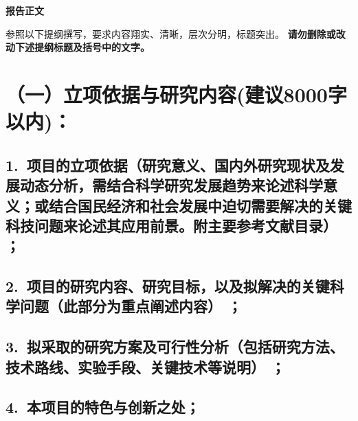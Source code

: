 \documentclass[12pt,UTF8,AutoFakeBold=2.5,a4paper]{ctexart} %
\begin{document}
\begin{center}
{\sanhao \templatefont \bfseries \hspace{2em} 报告正文}
\end{center}

{\sihao \templatefont 参照以下提纲撰写，要求内容翔实、清晰，层次分明，标题突出。{\color{MsBlue} \bfseries 请勿删除或改动下述提纲标题及括号中的文字。}}
\vskip -5mm

\section{{\bfseries（一）立项依据与研究内容}(建议8000字以内)：} %

\subsection{\hspace{1.45em} 1.~{\bfseries 项目的立项依据}（研究意义、国内外研究现状及发展动态分析，需结合科学研究发展趋势来论述科学意义；或结合国民经济和社会发展中迫切需要解决的关键科技问题来论述其应用前景。附主要参考文献目录）\hspace{-14pt} ；}






\subsection{\hspace{1.45em} 2.~{\bfseries 项目的研究内容、研究目标，以及拟解决的关键科学问题}（此部分为重点阐述内容）\hspace{-14pt} {\bfseries ；}}



\subsection{\hspace{1.45em}  3.~{\bfseries 拟采取的研究方案及可行性分析}（包括研究方法、技术路线、实验手段、关键技术等说明）\hspace{-14pt} ；}



\subsection{\hspace{1.45em}  4.~{\bfseries 本项目的特色与创新之处；}}
\end{document}

